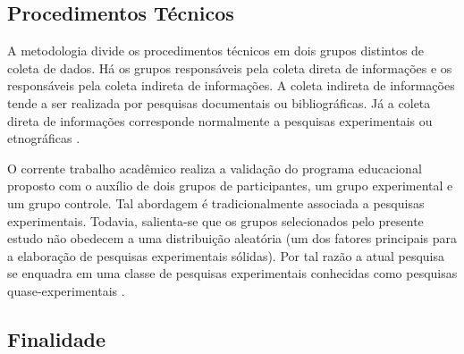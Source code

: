 \subsection{Procedimentos Técnicos}\label{sub:procedimentos}

\vspace{-0.14cm}


A metodologia divide os procedimentos técnicos em dois grupos distintos de coleta de dados. Há os grupos responsáveis pela coleta direta de informações e os responsáveis pela coleta indireta de informações. A coleta indireta de informações tende a ser realizada por pesquisas documentais ou bibliográficas. Já a coleta direta de informações corresponde normalmente a pesquisas experimentais ou etnográficas \cite{cordova2009pesquisa}. 

O corrente trabalho acadêmico realiza a validação do programa educacional proposto com o auxílio de dois grupos de participantes, um grupo experimental e um grupo controle. Tal abordagem é tradicionalmente associada a pesquisas experimentais. Todavia, salienta-se que os grupos selecionados pelo presente estudo não obedecem a uma distribuição aleatória (um dos fatores principais para a elaboração de pesquisas experimentais sólidas). Por tal razão a atual pesquisa se enquadra em uma classe de pesquisas experimentais conhecidas como pesquisas quase-experimentais .





\vspace{-0.3cm}


\subsection{Finalidade}\label{sub:finalidade}

